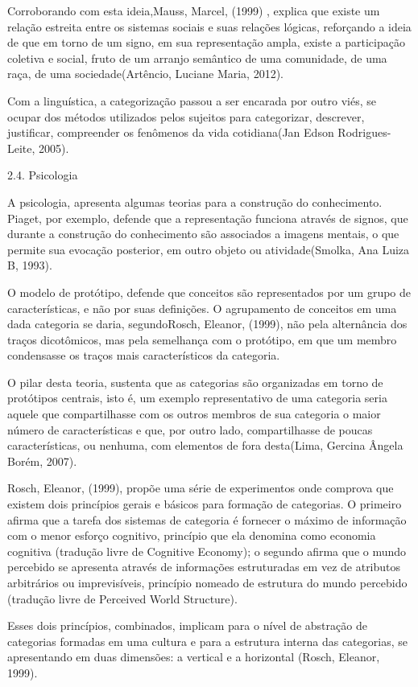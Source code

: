 Corroborando com esta ideia,Mauss, Marcel, (1999) , explica que existe um relação estreita entre os sistemas sociais e suas relações lógicas, reforçando a ideia de que em torno de um signo, em sua representação ampla, existe a participação coletiva e social, fruto de um arranjo semântico de uma comunidade, de uma raça, de uma sociedade(Artêncio, Luciane Maria, 2012).

Com a linguística, a categorização passou a ser encarada por outro viés, se ocupar dos métodos utilizados pelos sujeitos para categorizar, descrever, justificar, compreender os fenômenos da vida cotidiana(Jan Edson Rodrigues-Leite, 2005).

2.4. Psicologia

A psicologia, apresenta algumas teorias para a construção do conhecimento. Piaget, por exemplo, defende que a representação funciona através de signos, que durante a construção do conhecimento são associados a imagens mentais, o que permite sua evocação posterior, em outro objeto ou atividade(Smolka, Ana Luiza B, 1993).

O modelo de protótipo, defende que conceitos são representados por um grupo de características, e não por suas definições. O agrupamento de conceitos em uma dada categoria se daria, segundoRosch, Eleanor, (1999), não pela alternância dos traços dicotômicos, mas pela semelhança com o protótipo, em que um membro condensasse os traços mais característicos da categoria.

O pilar desta teoria, sustenta que as categorias são organizadas em torno de protótipos centrais, isto é, um exemplo representativo de uma categoria seria aquele que compartilhasse com os outros membros de sua categoria o maior número de características e que, por outro lado, compartilhasse de poucas características, ou nenhuma, com elementos de fora desta(Lima, Gercina Ângela Borém, 2007).

Rosch, Eleanor, (1999), propõe uma série de experimentos onde comprova que existem dois princípios gerais e básicos para formação de categorias. O primeiro afirma que a tarefa dos sistemas de categoria é fornecer o máximo de informação com o menor esforço cognitivo, princípio que ela denomina como economia cognitiva (tradução livre de Cognitive Economy); o segundo afirma que o mundo percebido se apresenta através de informações estruturadas em vez de atributos arbitrários ou imprevisíveis, princípio nomeado de estrutura do mundo percebido (tradução livre de Perceived World Structure).

Esses dois princípios, combinados, implicam para o nível de abstração de categorias formadas em uma cultura e para a estrutura interna das categorias, se apresentando em duas dimensões: a vertical e a horizontal (Rosch, Eleanor, 1999).

